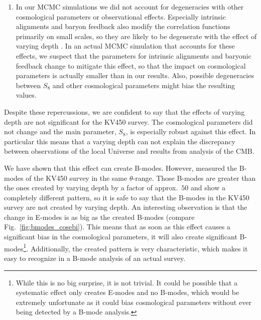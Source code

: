 \documentclass[referee]{aa} %
\renewcommand{\[}{\begin{equation}}
\renewcommand{\]}{\end{equation}}
\begin{document}
\begin{enumerate}
\item In our MCMC simulations we did not account for degeneracies with other cosmological parameters or observational effects. Especially intrinsic alignments and baryon feedback also modify the correlation functions primarily on small scales, so they are likely to be degenerate with the effect of varying depth \citep{Troxel:2015}. In an actual MCMC simulation that accounts for these effects, we suspect that the parameters for intrinsic alignments and baryonic feedback change to mitigate this effect, so that the impact on cosmological parameters is actually smaller than in our results. Also, possible degeneracies between $S_8$ and other cosmological parameters might bias the resulting values. %
\end{enumerate}

Despite these repercussions, we are confident to say that the effects of varying depth are not significant for the KV450 survey. The cosmological parameters did not change and the main parameter, $S_8$, is especially robust against this effect. In particular this means that a varying depth can not explain the discrepancy between observations of the local Universe and results from analysis of the CMB.

We have shown that this effect can create B-modes. However, \citet{2019A&A...624A.134A} measured the B-modes of the KV450 survey in the same $\theta$-range. Those B-modes are greater than the ones created by varying depth by a factor of approx.~$50$ and show a completely different pattern, so it is safe to say that the B-modes in the KV450 survey are not created by varying depth. An interesting observation is that the change in E-modes is as big as the created B-modes (compare Fig.~\ref{fig:bmodes_cosebi}). This means that as soon as this effect causes a significant bias in the cosmological parameters, it will also create significant B-modes\footnote{While this is no big surprise, it is not trivial. It could be possible that a systematic effect only creates E-modes and no B-modes, which would be extremely unfortunate as it could bias cosmological parameters without ever being detected by a B-mode analysis.}. Additionally, the created pattern is very characteristic, which makes it easy to recognize in a B-mode analysis of an actual survey.
\end{document}
